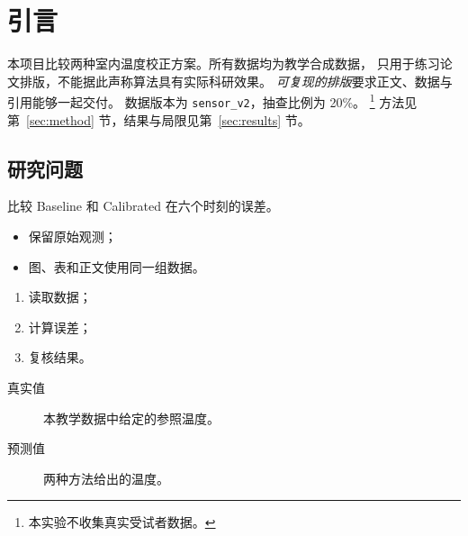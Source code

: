 \section{引言}\label{sec:intro}
本项目比较两种室内温度校正方案。所有数据均为教学合成数据，
只用于练习论文排版，不能据此声称算法具有实际科研效果。
\emph{可复现的排版}要求正文、数据与引用能够一起交付。
数据版本为 \texttt{sensor\_v2}，抽查比例为 20\%。
\footnote{本实验不收集真实受试者数据。}
方法见第~\ref{sec:method} 节，结果与局限见第~\ref{sec:results} 节。
\subsection{研究问题}
比较 Baseline 和 Calibrated 在六个时刻的误差。
\begin{itemize}
  \item 保留原始观测；
  \item 图、表和正文使用同一组数据。
\end{itemize}
\begin{enumerate}
  \item 读取数据；\item 计算误差；\item 复核结果。
\end{enumerate}
\begin{description}
  \item[真实值] 本教学数据中给定的参照温度。
  \item[预测值] 两种方法给出的温度。
\end{description}
